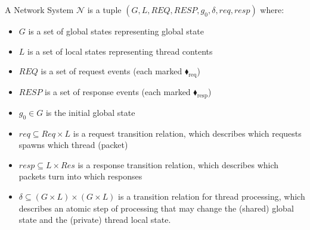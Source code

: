     
A Network System $\mathcal{N}$ is a tuple $(G, L, \mathit{REQ}, \mathit{RESP}, g_0, \delta, \mathit{req}, \mathit{resp})$ where:
\begin{itemize}
\item $G$ is a set of global states representing global state
\item $L$ is a set of local states representing thread contents
\item $\mathit{REQ}$ is a set of request events (each marked {\color{ForestGreen}$\blacklozenge_\text{req}$})
\item $\mathit{RESP}$ is a set of response events (each marked {\color{red}$\blacklozenge_\text{resp}$})
\item $g_0 \in G$ is the initial global state
\item $\mathit{req} \subseteq \mathit{Req} \times L$ is a request transition relation, which describes which requests spawns which thread (packet)
\item $\mathit{resp} \subseteq L \times \mathit{Res}$ is a response transition relation, which describes which packets turn into which responses
\item $\delta \subseteq (G \times L) \times (G \times L)$ is a transition relation for thread processing, which describes an atomic step of processing that may change the (shared) global state and the (private) thread local state.
\end{itemize}

